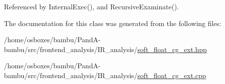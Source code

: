 Referenced by Internal\+Exec(), and Recursive\+Examinate().



The documentation for this class was generated from the following files\+:\begin{DoxyCompactItemize}
\item 
/home/osboxes/bambu/\+Pand\+A-\/bambu/src/frontend\+\_\+analysis/\+I\+R\+\_\+analysis/\hyperlink{soft__float__cg__ext_8hpp}{soft\+\_\+float\+\_\+cg\+\_\+ext.\+hpp}\item 
/home/osboxes/bambu/\+Pand\+A-\/bambu/src/frontend\+\_\+analysis/\+I\+R\+\_\+analysis/\hyperlink{soft__float__cg__ext_8cpp}{soft\+\_\+float\+\_\+cg\+\_\+ext.\+cpp}\end{DoxyCompactItemize}
